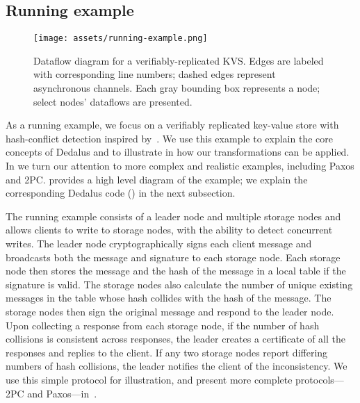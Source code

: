 \subsection{Running example}
\label{sec:running-example}

\begin{figure}[t]
    \centering
    \texttt{[image: assets/running-example.png]}
    \caption{Dataflow diagram for a verifiably-replicated KVS.
    Edges are labeled with corresponding line numbers; dashed edges represent asynchronous channels. Each gray bounding box represents a node; select nodes' dataflows are presented.}
    \label{fig:running-example}
\end{figure}

As a running example, we focus on a verifiably replicated key-value store with hash-conflict detection inspired by~\cite{basil}.
We use this example to explain the core concepts of Dedalus and to illustrate in  how our transformations can be applied. In  we turn our attention to 
more complex and realistic examples, including Paxos and 2PC.
 provides a high level diagram of the example; we explain the corresponding Dedalus code () in the next subsection.

The running example consists of a leader node and multiple storage nodes and allows clients to write to storage nodes, with the ability to detect concurrent writes.
The leader node cryptographically signs each client message and broadcasts both the message and signature to each storage node.
Each storage node then stores the message and the hash of the message in a local table if the signature is valid.
The storage nodes also calculate the number of unique existing messages in the table whose hash collides with the hash of the message.
The storage nodes then sign the original message and respond to the leader node.
Upon collecting a response from each storage node, if the number of hash collisions is consistent across responses, the leader creates a certificate of all the responses and replies to the client.
If any two storage nodes report differing numbers of hash collisions, the leader notifies the client of the inconsistency.
We use this simple protocol for illustration, and present more complete protocols---2PC and Paxos---in~.


